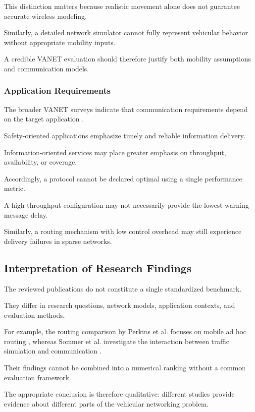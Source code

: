 This distinction
matters because
realistic movement
alone does not
guarantee accurate
wireless modeling.

Similarly, a detailed
network simulator
cannot fully represent
vehicular behavior
without appropriate
mobility inputs.

A credible VANET
evaluation should
therefore justify
both mobility
assumptions and
communication models.

\subsubsection{Application Requirements}

The broader VANET
surveys indicate
that communication
requirements depend
on the target
application
\cite{Hartenstein2008,Karagiannis2011}.

Safety-oriented
applications emphasize
timely and reliable
information delivery.

Information-oriented
services may place
greater emphasis
on throughput,
availability,
or coverage.

Accordingly,
a protocol cannot
be declared optimal
using a single
performance metric.

A high-throughput
configuration may
not necessarily
provide the lowest
warning-message
delay.

Similarly,
a routing mechanism
with low control
overhead may still
experience delivery
failures in sparse
networks.

\subsection{Interpretation of Research Findings}

The reviewed publications
do not constitute
a single standardized
benchmark.

They differ in
research questions,
network models,
application contexts,
and evaluation methods.

For example,
the routing comparison
by Perkins et al.
focuses on mobile
ad hoc routing
\cite{Perkins2001},
whereas Sommer et al.
investigate the
interaction between
traffic simulation
and communication
\cite{Sommer2011}.

Their findings
cannot be combined
into a numerical
ranking without
a common evaluation
framework.

The appropriate
conclusion is
therefore qualitative:
different studies
provide evidence
about different
parts of the
vehicular networking
problem.

